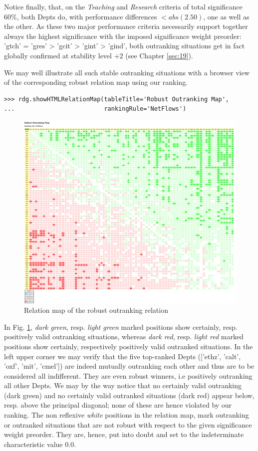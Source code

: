 Notice finally, that, on the \emph{Teaching} and \emph{Research} criteria of total significance $60\%$, both Depts do, with performance differences $< abs(2.50)$, one as well as the other. As these two major performance criteria necessarily support together always the highest significance with the imposed significance weight preorder: 'gtch' = 'gres' > 'gcit' > 'gint' > 'gind', both outranking situations get in fact globally confirmed at stability level $+2$ (see Chapter \ref{sec:19}).

We may well illustrate all such stable outranking situations with a browser view of the corresponding robust relation map using our \NetFlows ranking.

\begin{lstlisting}
>>> rdg.showHTMLRelationMap(tableTitle='Robust Outranking Map',
...                         rankingRule='NetFlows')
\end{lstlisting}

\begin{figure}[h]
\includegraphics[width=12cm]{Figures/the_cs_RelationMap.png}
\caption{Relation map of the robust outranking relation}
\label{fig:13.2}       %
\end{figure}

In Fig. \ref{fig:13.2}, \emph{dark green}, resp. \emph{light green} marked positions show certainly, resp. positively valid outranking situations, whereas \emph{dark red}, resp. \emph{light red} marked positions show certainly, respectively positively valid outranked situations. In the left upper corner we may verify that the five top-ranked Depts (['ethz', 'calt', 'oxf', 'mit', 'cmel']) are indeed mutually outranking each other and thus are to be considered all indifferent. They are even robust \Condorcet winners, i.e positively outranking all other Depts. We may by the way notice that no certainly valid outranking (dark green) and no certainly valid outranked situations (dark red) appear below, resp. above the principal diagonal; none of these are hence violated by our \NetFlows ranking. The non reflexive \emph{white} positions in the relation map, mark outranking or outranked situations that are not robust with respect to the given significance weight preorder. They are, hence, put into doubt and set to the indeterminate characteristic value $0.0$.

